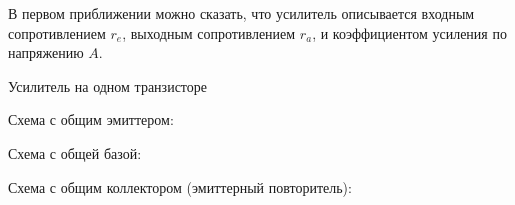 \documentclass[
a4paper
,11pt
,landscape
,russian
,twocolumn
]{letter}
\begin{document}
В первом приближении можно сказать, что усилитель описывается
входным сопротивлением $r_e$, выходным сопротивлением $r_a$, и
коэффициентом усиления по напряжению $A$.

\vspace{.2in}

\begin{Large}
Усилитель на одном транзисторе
\end{Large}

\vspace{.2in}

Схема с общим эмиттером:

Схема с общей базой:

Схема с общим коллектором (эмиттерный повторитель):
\end{document}
